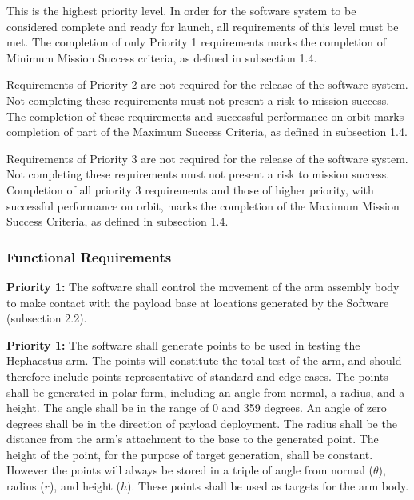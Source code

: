 
This is the highest priority level. In order for the software system to be considered complete and ready for launch, all requirements of this level must be met.
The completion of only Priority 1 requirements marks the completion of Minimum Mission Success criteria, as defined in subsection 1.4.

Requirements of Priority 2 are not required for the release of the software system.
Not completing these requirements must not present a risk to mission success.
The completion of these requirements and successful performance on orbit marks completion of part of the Maximum Success Criteria, as defined in subsection 1.4.

Requirements of Priority 3 are not required for the release of the software system.
Not completing these requirements must not present a risk to mission success.
Completion of all priority 3 requirements and those of higher priority, with successful performance on orbit, marks the completion of the Maximum Mission Success Criteria, as defined in subsection 1.4.

\subsubsection{Functional Requirements}

\textbf{Priority 1:}
The software shall control the movement of the arm assembly body to make contact with the payload base
at locations generated by the Software (subsection 2.2). 

\textbf{Priority 1:}
The software shall generate points to be used in testing the Hephaestus arm.
The points will constitute the total test of the arm, and should therefore include points
representative of standard and edge cases.
The points shall be generated in polar form, including an angle from normal, a radius, and a height. 
The angle shall be in the range of 0 and 359 degrees.
An angle of zero degrees shall be in the direction of payload deployment.
The radius shall be the distance from the arm's attachment to the base to the generated point.
The height of the point, for the purpose of target generation, shall be constant.
However the points will always be stored in a triple of angle from normal (\(\theta\)), radius (\(r\)), and height (\(h\)).
These points shall be used as targets for the arm body.

